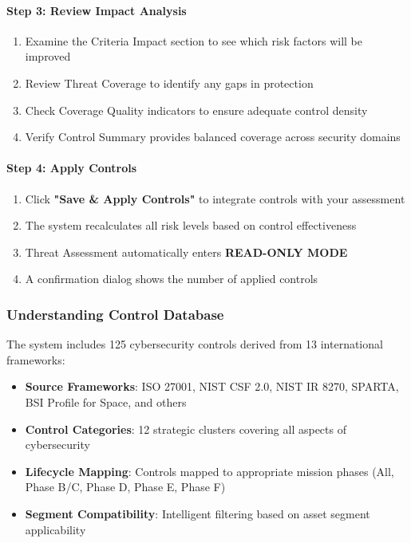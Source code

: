 \documentclass[binding=0.6cm]{sapthesis}
\begin{document}
\paragraph{Step 3: Review Impact Analysis}
\begin{enumerate}
    \item Examine the Criteria Impact section to see which risk factors will be improved
    \item Review Threat Coverage to identify any gaps in protection
    \item Check Coverage Quality indicators to ensure adequate control density
    \item Verify Control Summary provides balanced coverage across security domains
\end{enumerate}

\paragraph{Step 4: Apply Controls}
\begin{enumerate}
    \item Click \textbf{"Save \& Apply Controls"} to integrate controls with your assessment
    \item The system recalculates all risk levels based on control effectiveness
    \item Threat Assessment automatically enters \textbf{READ-ONLY MODE}
    \item A confirmation dialog shows the number of applied controls
\end{enumerate}

\subsubsection{Understanding Control Database}

The system includes 125 cybersecurity controls derived from 13 international frameworks:

\begin{itemize}
    \item \textbf{Source Frameworks}: ISO 27001, NIST CSF 2.0, NIST IR 8270, SPARTA, BSI Profile for Space, and others
    \item \textbf{Control Categories}: 12 strategic clusters covering all aspects of cybersecurity
    \item \textbf{Lifecycle Mapping}: Controls mapped to appropriate mission phases (All, Phase B/C, Phase D, Phase E, Phase F)
    \item \textbf{Segment Compatibility}: Intelligent filtering based on asset segment applicability
\end{itemize}
\end{document}
